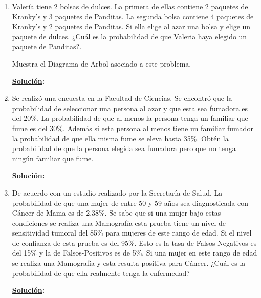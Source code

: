 \documentclass[11pt,letterpaper]{report}
\newcommand{\sol}{\textbf{\underline{Solución}: }} %
\begin{document}
\begin{enumerate}
Demuestra lo siguiente:

\[
    \sum_{i=1}^{\infty} a_i (\prod_{j=1}^{i-1} (i - a_i)) +
        \prod_{i=1}^{\infty} (1 - a_i) = 1
\]

\textit{Hint:} Supón que se realizan una infinidad de ``Volados''. Sea $a_i$ la probabilidad de que
en el i-ésimo lanzamiento cae por primera vez Águila.

\sol \begin{proof}
    
\end{proof}

\item Valería tiene 2 bolsas de dulces. La primera de ellas contiene 2 paquetes de Kranky's y 3
paquetes de Panditas. La segunda bolsa contiene 4 paquetes de Kranky's y 2 paquetes de Panditas.
Si ella elige al azar una bolsa y elige un paquete de dulces. ¿Cuál es la probabilidad de que
Valeria haya elegido un paquete de Panditas?.

Muestra el Diagrama de Arbol asociado a este problema.

\sol

\item Se realizó una encuesta en la Facultad de Ciencias. Se encontró que la probabilidad de
seleccionar una persona al azar y que esta sea fumadora es del 20\%. La probabilidad de que al
menos la persona tenga un familiar que fume es del 30\%. Además si esta persona al menos tiene un
familiar fumador la probabilidad de que ella misma fume se eleva hasta 35\%. Obtén la probabilidad
de que la persona elegida sea fumadora pero que no tenga ningún familiar que fume.

\sol

\item De acuerdo con un estudio realizado por la Secretaría de Salud. La probabilidad de que una
mujer de entre 50 y 59 años sea diagnosticada con Cáncer de Mama es de 2.38\%. Se sabe que si una
mujer bajo estas condiciones se realiza una Mamografía esta prueba tiene un nivel de sensitividad
tumoral del 85\% para mujeres de este rango de edad. Si el nivel de confianza de esta prueba es del
95\%. Esto es la tasa de Falsos-Negativos es del 15\% y la de Falsos-Positivos es de 5\%. Si una
mujer en este rango de edad se realiza una Mamografía y esta resulta positiva para Cáncer. ¿Cuál
es la probabilidad de que ella realmente tenga la enfermedad?

\sol


\end{enumerate}
\end{document}
